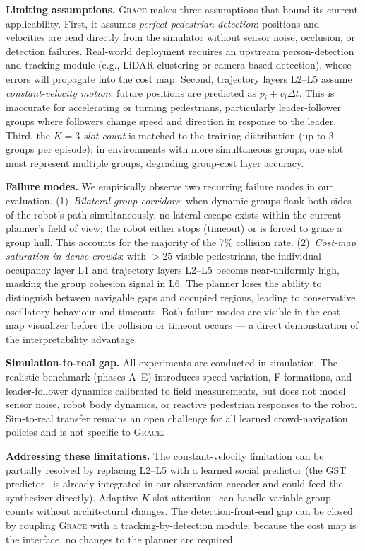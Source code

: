 \documentclass{article}
\newcommand{\grace}{\textsc{Grace}}
\begin{document}
\textbf{Limiting assumptions.}
\grace{} makes three assumptions that bound its current applicability.
First, it assumes \emph{perfect pedestrian detection}: positions and velocities
are read directly from the simulator without sensor noise, occlusion, or
detection failures. Real-world deployment requires an upstream person-detection
and tracking module (e.g., LiDAR clustering or camera-based detection), whose
errors will propagate into the cost map.
Second, trajectory layers L2--L5 assume \emph{constant-velocity motion}: future
positions are predicted as $p_i + v_i \Delta t$. This is inaccurate for
accelerating or turning pedestrians, particularly leader-follower groups where
followers change speed and direction in response to the leader.
Third, the \emph{$K=3$ slot count} is matched to the training distribution
(up to 3 groups per episode); in environments with more simultaneous groups,
one slot must represent multiple groups, degrading group-cost layer accuracy.

\textbf{Failure modes.}
We empirically observe two recurring failure modes in our evaluation.
(1)~\emph{Bilateral group corridors}: when dynamic groups flank both sides of
the robot's path simultaneously, no lateral escape exists within the current
planner's field of view; the robot either stops (timeout) or is forced to
graze a group hull. This accounts for the majority of the 7\% collision rate.
(2)~\emph{Cost-map saturation in dense crowds}: with $>$25 visible pedestrians,
the individual occupancy layer L1 and trajectory layers L2--L5 become
near-uniformly high, masking the group cohesion signal in L6.
The planner loses the ability to distinguish between navigable gaps and occupied
regions, leading to conservative oscillatory behaviour and timeouts.
Both failure modes are visible in the cost-map visualizer before the collision
or timeout occurs — a direct demonstration of the interpretability advantage.

\textbf{Simulation-to-real gap.}
All experiments are conducted in simulation. The realistic benchmark
(phases A--E) introduces speed variation, F-formations, and leader-follower
dynamics calibrated to field measurements, but does not model sensor noise,
robot body dynamics, or reactive pedestrian responses to the robot.
Sim-to-real transfer remains an open challenge for all learned crowd-navigation
policies and is not specific to \grace{}.

\textbf{Addressing these limitations.}
The constant-velocity limitation can be partially resolved by replacing
L2--L5 with a learned social predictor (the GST predictor~\citep{liu2022intention}
is already integrated in our observation encoder and could feed the synthesizer
directly).
Adaptive-$K$ slot attention~\citep{locatello2020object} can handle variable
group counts without architectural changes.
The detection-front-end gap can be closed by coupling \grace{} with a
tracking-by-detection module; because the cost map is the interface, no
changes to the planner are required.
\end{document}
